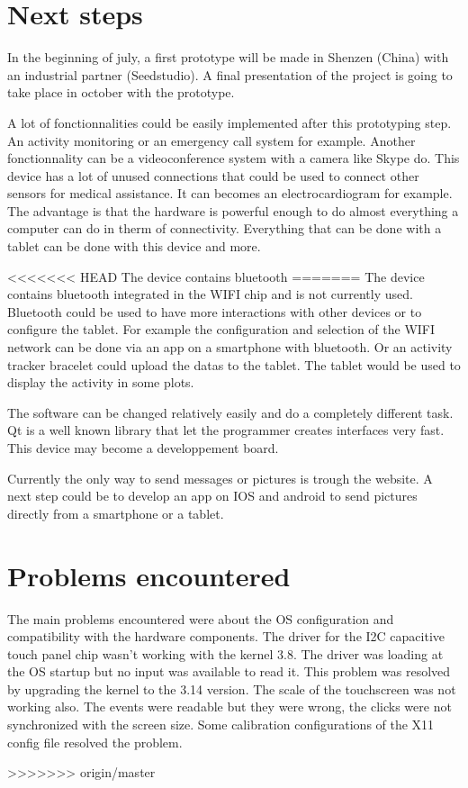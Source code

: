 \section{Next steps}
\label{chap: next steps}

In the beginning of july, a first prototype will be made in Shenzen (China) with an industrial partner (Seedstudio). A final presentation of the project is going to take place in october with the prototype.

A lot of fonctionnalities could be easily implemented after this prototyping step. An activity monitoring or an emergency call system for example. Another fonctionnality can be a videoconference system with a camera like Skype do. This device has a lot of unused connections that could be used to connect other sensors for medical assistance. It can becomes an electrocardiogram for example. The advantage is that the hardware is powerful enough to do almost everything a computer can do in therm of connectivity. Everything that can be done with a tablet can be done with this device and more.

<<<<<<< HEAD
The device contains bluetooth
=======
The device contains bluetooth integrated in the WIFI chip and is not currently used. Bluetooth could be used to have more interactions with other devices or to configure the tablet. For example the configuration and selection of the WIFI network can be done via an app on a smartphone with bluetooth. Or an activity tracker bracelet could upload the datas to the tablet. The tablet would be used to display the activity in some plots.

The software can be changed relatively easily and do a completely different task. Qt is a well known library that let the programmer creates interfaces very fast. This device may become a developpement board.

Currently the only way to send messages or pictures is trough the website. A next step could be to develop an app on IOS and android to send pictures directly from a smartphone or a tablet.

\section{Problems encountered}

The main problems encountered were about the OS configuration and compatibility with the hardware components. The driver for the I2C capacitive touch panel chip wasn't working with the kernel 3.8. The driver was loading at the OS startup but no input was available to read it. This problem was resolved by upgrading the kernel to the 3.14 version. The scale of the touchscreen was not working also. The events were readable but they were wrong, the clicks were not synchronized with the screen size. Some calibration configurations of the X11 config file resolved the problem.

>>>>>>> origin/master

